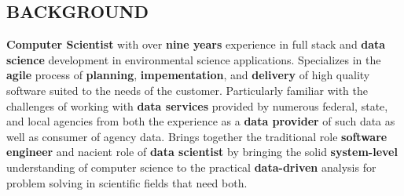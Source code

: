 \documentclass[line,margin]{res}
\begin{document}
\address{104 14th Street, Prairie du Sac, WI 53578}
\address{email: jordan@jordanwalker.us | phone: 608.370.1908}
 
\begin{resume}
 
\section{BACKGROUND}
	\textbf{Computer Scientist} with over \textbf{nine years} experience in full stack and \textbf{data science} development in environmental science applications.
	Specializes in the \textbf{agile} process of \textbf{planning}, \textbf{impementation}, and \textbf{delivery} of high quality software suited to the needs of the customer.
	Particularly familiar with the challenges of working with \textbf{data services} provided by numerous federal, state, and local agencies from both the experience as a \textbf{data provider} of such data as well as consumer of agency data.
	Brings together the traditional role \textbf{software engineer} and nacient role of \textbf{data scientist} by bringing the solid \textbf{system-level} understanding of computer science to the practical \textbf{data-driven} analysis for problem solving in scientific fields that need both.



\end{resume}
\end{document}
